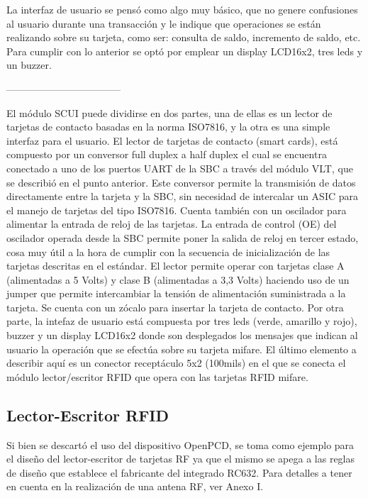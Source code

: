 La interfaz de usuario se pensó como algo muy básico, que no genere confusiones al usuario durante una transacción y le indique que operaciones se están realizando sobre su tarjeta, como ser: consulta de saldo, incremento de saldo, etc. Para cumplir con lo anterior se optó por emplear un display LCD16x2, tres leds y un buzzer.

\bigskip
-----------------------------------
\bigskip

El módulo SCUI puede dividirse en dos partes, una de ellas es un lector de tarjetas de contacto basadas en la norma ISO7816, y la otra es una simple interfaz para el usuario.
El lector de tarjetas de contacto (smart cards), está compuesto por un conversor full duplex a half duplex el cual se encuentra conectado a uno de los puertos UART de la SBC a través del módulo VLT, que se describió en el punto anterior. Este conversor permite la transmisión de datos directamente entre la tarjeta y la SBC, sin necesidad de intercalar un ASIC para el manejo de tarjetas del tipo ISO7816. Cuenta también con un oscilador para alimentar la entrada de reloj de las tarjetas. La entrada de control (OE) del oscilador operada desde la SBC permite poner la salida de reloj en tercer estado, cosa muy útil a la hora de cumplir con la secuencia de inicialización de las tarjetas descritas en el estándar. El lector permite operar con tarjetas clase A (alimentadas a 5 Volts) y clase B (alimentadas a 3,3 Volts) haciendo uso de un jumper que permite intercambiar la tensión de alimentación suministrada a la tarjeta. Se cuenta con un zócalo para insertar la tarjeta de contacto.
Por otra parte, la intefaz de usuario está compuesta por tres leds (verde, amarillo y rojo), buzzer y un display LCD16x2 donde son desplegados los mensajes que indican al usuario la operación que se efectúa sobre su tarjeta mifare.
El último elemento a describir aquí es un conector receptáculo 5x2 (100mils) en el que se conecta el módulo lector/escritor RFID que opera con las tarjetas RFID mifare.

\subsection{Lector-Escritor RFID}
Si bien se descartó el uso del dispositivo OpenPCD, se toma como ejemplo para el
diseño del lector-escritor de tarjetas RF ya que el mismo se apega a las reglas de
diseño que establece el fabricante del integrado RC632.
Para detalles a tener en cuenta en la realización de una antena RF, ver Anexo I.

